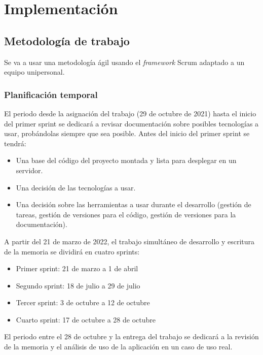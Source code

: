 \chapter{Implementación}

\section{Metodología de trabajo}

Se va a usar una metodología ágil usando el \textit{framework} Scrum adaptado a un equipo unipersonal.


\subsection{Planificación temporal}

El periodo desde la asignación del trabajo (29 de octubre de 2021) hasta el inicio del primer sprint se dedicará a revisar documentación sobre posibles tecnologías a usar, probándolas siempre que sea posible. Antes del inicio del primer sprint se tendrá:

\begin{itemize}
    \item Una base del código del proyecto montada y lista para desplegar en un servidor.
    \item Una decisión de las tecnologías a usar.
    \item Una decisión sobre las herramientas a usar durante el desarrollo (gestión de tareas, gestión de versiones para el código, gestión de versiones para la documentación).
\end{itemize}

A partir del 21 de marzo de 2022, el trabajo simultáneo de desarrollo y escritura de la memoria se dividirá en cuatro sprints:
\begin{itemize}
    \item Primer sprint: 21 de marzo a 1 de abril
    \item Segundo sprint: 18 de julio a 29 de julio
    \item Tercer sprint: 3 de octubre a 12 de octubre
    \item Cuarto sprint: 17 de octubre a 28 de octubre
\end{itemize}

El periodo entre el 28 de octubre y la entrega del trabajo se dedicará a la revisión de la memoria y el análisis de uso de la aplicación en un caso de uso real.


